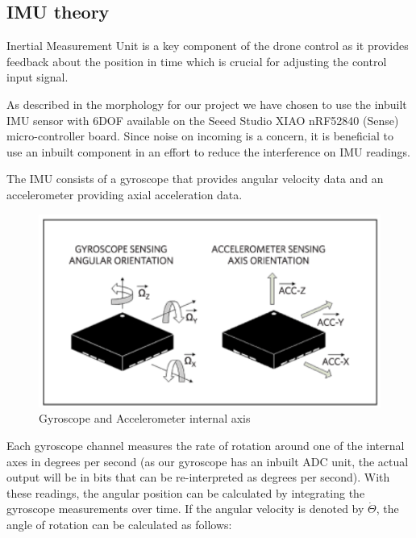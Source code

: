 \subsection{IMU theory}

Inertial Measurement Unit is a key component of the drone control as it provides feedback about the position in time which is crucial for adjusting the control input signal.

As described in the morphology for our project we have chosen to use the inbuilt IMU sensor with 6DOF available on the Seeed Studio XIAO nRF52840 (Sense) micro-controller board. Since noise on incoming is a concern, it is beneficial to use an inbuilt component in an effort to reduce the interference on IMU readings.

The IMU consists of a gyroscope that provides angular velocity
data and an accelerometer providing axial acceleration data.

\begin{figure}[H]
    \begin{center}
    \includegraphics[scale = 0.5]{pictures/IMU/Gyro.png}
    \end{center}
    \caption{Gyroscope and Accelerometer internal axis}
    \label{fig:my_label}
\end{figure}


Each gyroscope channel measures the rate of rotation around one of the internal axes in degrees per second (as our gyroscope has an inbuilt ADC unit, the actual output will be in bits that can be re-interpreted as degrees per second). With these readings, the angular position can be calculated by integrating the gyroscope measurements over time. If the angular velocity is denoted by $\dot{\Theta}$, the angle of rotation can be calculated as follows:

